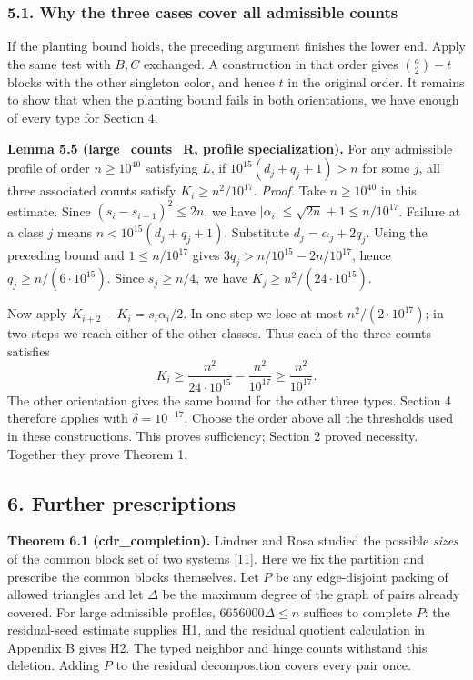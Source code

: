\documentclass[english,11pt,a4paper]{article}
\begin{document}
\subsubsection{5.1. Why the three cases cover all admissible counts}\label{why-the-three-cases-cover-all-admissible-counts}

If the planting bound holds, the preceding argument finishes the lower end. Apply the same test with \(B,C\) exchanged. A construction in that order gives \(\binom a2-t\) blocks with the other singleton color, and hence \(t\) in the original order. It remains to show that when the planting bound fails in both orientations, we have enough of every type for Section 4.

\textbf{Lemma 5.5 (large\_counts\_R, profile specialization).} For any admissible profile of order \(n\ge10^{40}\) satisfying \(L\), if \(10^{15}(d_j+q_j+1)>n\) for some \(j\), all three associated counts satisfy \(K_i\ge n^2/10^{17}\). \emph{Proof.} Take \(n\ge10^{40}\) in this estimate. Since \((s_i-s_{i+1})^2\le2n\), we have \(|\alpha_i|\le\sqrt{2n}+1\le n/10^{17}\). Failure at a class \(j\) means \(n<10^{15}(d_j+q_j+1)\). Substitute \(d_j=\alpha_j+2q_j\). Using the preceding bound and \(1\le n/10^{17}\) gives \(3q_j>n/10^{15}-2n/10^{17}\), hence \(q_j\ge n/(6\cdot10^{15})\). Since \(s_j\ge n/4\), we have \(K_j\ge n^2/(24\cdot10^{15})\).

Now apply \(K_{i+2}-K_i=s_i\alpha_i/2\). In one step we lose at most \(n^2/(2\cdot10^{17})\); in two steps we reach either of the other classes. Thus each of the three counts satisfies \[K_i\ge\frac{n^2}{24\cdot10^{15}}-\frac{n^2}{10^{17}}\ge\frac{n^2}{10^{17}}.\] The other orientation gives the same bound for the other three types. Section 4 therefore applies with \(\delta=10^{-17}\). Choose the order above all the thresholds used in these constructions. This proves sufficiency; Section 2 proved necessity. Together they prove Theorem 1.

\subsection{6. Further prescriptions}\label{further-prescriptions}

\textbf{Theorem 6.1 (cdr\_completion).} Lindner and Rosa studied the possible \emph{sizes} of the common block set of two systems {[}11{]}. Here we fix the partition and prescribe the common blocks themselves. Let \(P\) be any edge-disjoint packing of allowed triangles and let \(\Delta\) be the maximum degree of the graph of pairs already covered. For large admissible profiles, \(6656000\Delta\le n\) suffices to complete \(P\): the residual-seed estimate supplies H1, and the residual quotient calculation in Appendix B gives H2. The typed neighbor and hinge counts withstand this deletion. Adding \(P\) to the residual decomposition covers every pair once.
\end{document}
